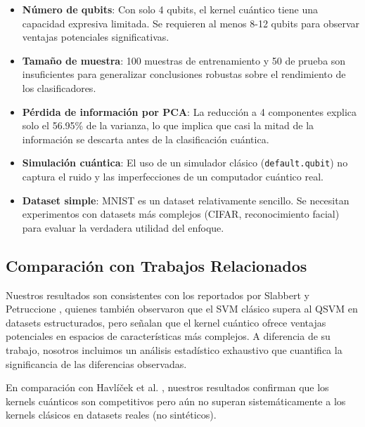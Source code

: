 \documentclass[conference]{IEEEtran}
\begin{document}
\begin{itemize}
    \item \textbf{Número de qubits}: Con solo 4 qubits, el kernel cuántico 
          tiene una capacidad expresiva limitada. Se requieren al menos 8-12 
          qubits para observar ventajas potenciales significativas.
    \item \textbf{Tamaño de muestra}: 100 muestras de entrenamiento y 50 de 
          prueba son insuficientes para generalizar conclusiones robustas sobre 
          el rendimiento de los clasificadores.
    \item \textbf{Pérdida de información por PCA}: La reducción a 4 componentes 
          explica solo el 56.95\% de la varianza, lo que implica que casi la 
          mitad de la información se descarta antes de la clasificación cuántica.
    \item \textbf{Simulación cuántica}: El uso de un simulador clásico 
          (\texttt{default.qubit}) no captura el ruido y las imperfecciones de 
          un computador cuántico real.
    \item \textbf{Dataset simple}: MNIST es un dataset relativamente sencillo. 
          Se necesitan experimentos con datasets más complejos (CIFAR, 
          reconocimiento facial) para evaluar la verdadera utilidad del enfoque.
\end{itemize}

\subsection{Comparación con Trabajos Relacionados}

Nuestros resultados son consistentes con los reportados por Slabbert y 
Petruccione \cite{slabbert2024hybrid}, quienes también observaron que el SVM 
clásico supera al QSVM en datasets estructurados, pero señalan que el kernel 
cuántico ofrece ventajas potenciales en espacios de características más 
complejos. A diferencia de su trabajo, nosotros incluimos un análisis 
estadístico exhaustivo que cuantifica la significancia de las diferencias 
observadas.

En comparación con Havlíček et al. \cite{havlicek2019supervised}, nuestros 
resultados confirman que los kernels cuánticos son competitivos pero aún no 
superan sistemáticamente a los kernels clásicos en datasets reales 
(no sintéticos).

\end{document}
